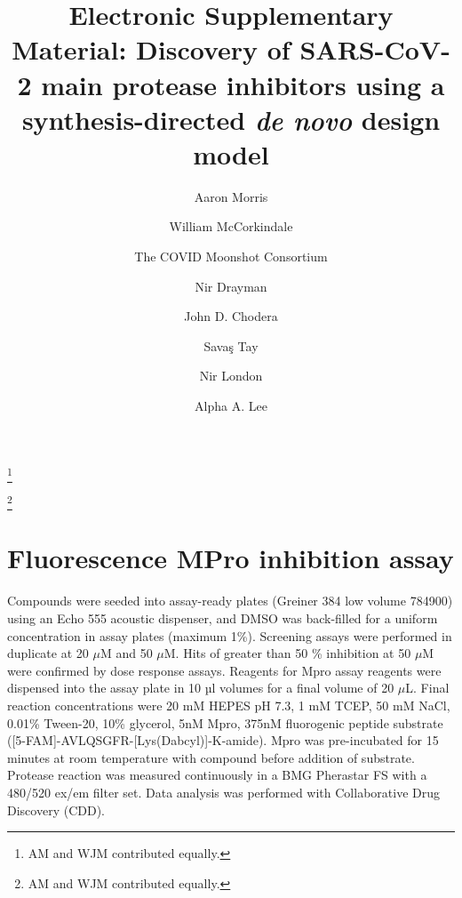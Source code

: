 \documentclass[12pt,aps,showpacs,superscriptaddress,footinbib,preprint,noshowpacs]{revtex4-1}
\begin{document}
\title{Electronic Supplementary Material: Discovery of SARS-CoV-2 main protease inhibitors using a synthesis-directed \emph{de novo} design model}

\author{Aaron Morris}
\thanks{AM and WJM contributed equally.} 

\author{William McCorkindale}
\thanks{AM and WJM contributed equally.} 

\author{The COVID Moonshot Consortium}

\author{Nir Drayman}

\author{John D. Chodera}

\author{Sava\c{s} Tay}

\author{Nir London}

\author{Alpha A. Lee}


\maketitle

\section{Fluorescence MPro inhibition assay}

Compounds were seeded into assay-ready plates (Greiner 384 low volume 784900) using an Echo 555 acoustic dispenser, and DMSO was back-filled for a uniform concentration in assay plates (maximum 1\%). Screening assays were performed in duplicate at 20 $\mu$M and 50 $\mu$M. Hits of greater than 50 \% inhibition at 50 $\mu$M were confirmed by dose response assays. Reagents for Mpro assay reagents were dispensed into the assay plate in 10 µl volumes for a final volume of 20 $\mu$L. 
Final reaction concentrations were 20 mM HEPES pH 7.3, 1 mM TCEP, 50 mM NaCl, 0.01\% Tween-20, 10\% glycerol, 5nM Mpro, 375nM fluorogenic peptide substrate ([5-FAM]-AVLQSGFR-[Lys(Dabcyl)]-K-amide). 
Mpro was pre-incubated for 15 minutes at room temperature with compound before addition of substrate. Protease reaction was measured continuously in a BMG Pherastar FS with a 480/520 ex/em filter set. Data analysis was performed with Collaborative Drug Discovery (CDD).
\end{document}
